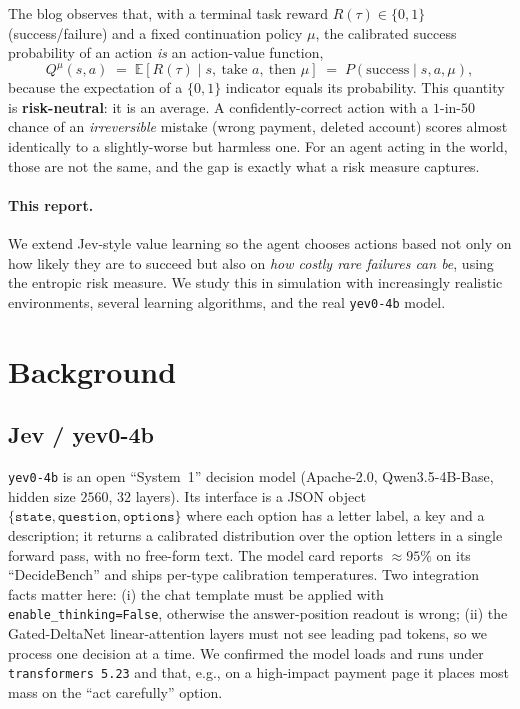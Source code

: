 \documentclass[11pt]{article}
\newcommand{\E}{\mathbb{E}}
\begin{document}
The blog observes that, with a terminal task reward
$R(\tau)\in\{0,1\}$ (success/failure) and a fixed continuation policy $\mu$,
the calibrated success probability of an action \emph{is} an action-value function,
\begin{equation}
Q^{\mu}(s,a) \;=\; \E\!\left[R(\tau)\mid s,\ \text{take } a,\ \text{then } \mu\right]
\;=\; P(\text{success}\mid s,a,\mu),
\end{equation}
because the expectation of a $\{0,1\}$ indicator equals its probability. This
quantity is \textbf{risk-neutral}: it is an average. A confidently-correct action
with a $1$-in-$50$ chance of an \emph{irreversible} mistake (wrong payment, deleted
account) scores almost identically to a slightly-worse but harmless one. For an
agent acting in the world, those are not the same, and the gap is exactly what a
risk measure captures.

\paragraph{This report.} We extend Jev-style value learning so the agent chooses
actions based not only on how likely they are to succeed but also on \emph{how
costly rare failures can be}, using the entropic risk measure. We study this in
simulation with increasingly realistic environments, several learning algorithms,
and the real \texttt{yev0-4b} model.

\section{Background}

\subsection{Jev / yev0-4b}
\texttt{yev0-4b} is an open ``System~1'' decision model (Apache-2.0, Qwen3.5-4B-Base,
hidden size $2560$, $32$ layers). Its interface is a JSON object
$\{\texttt{state},\texttt{question},\texttt{options}\}$ where each option has a
letter label, a key and a description; it returns a calibrated distribution over
the option letters in a single forward pass, with no free-form text. The model card
reports $\approx 95\%$ on its ``DecideBench'' and ships per-type calibration
temperatures. Two integration facts matter here: (i) the chat template must be
applied with \texttt{enable\_thinking=False}, otherwise the answer-position readout
is wrong; (ii) the Gated-DeltaNet linear-attention layers must not see leading pad
tokens, so we process one decision at a time. We confirmed the model loads and runs
under \texttt{transformers 5.23} and that, e.g., on a high-impact payment page it
places most mass on the ``act carefully'' option.
\end{document}
